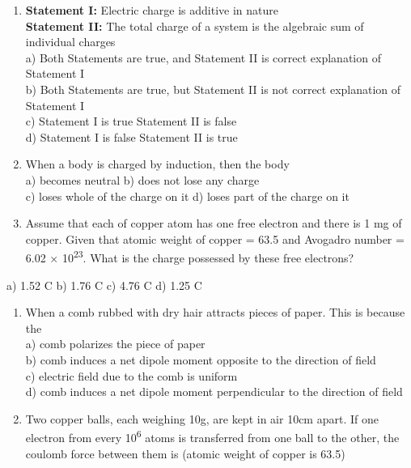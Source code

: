 \begin{enumerate}
\def\labelenumi{\arabic{enumi}.}
\setcounter{enumi}{4}
\item
  \textbf{Statement I:} Electric charge is additive in nature\\
  \textbf{Statement II:} The total charge of a system is the algebraic
  sum of individual charges\\
  a) Both Statements are true, and Statement II is correct explanation
  of Statement I\\
  b) Both Statements are true, but Statement II is not correct
  explanation of Statement I\\
  c) Statement I is true Statement II is false\\
  d) Statement I is false Statement II is true
\item
  When a body is charged by induction, then the body\\
  a) becomes neutral b) does not lose any charge\\
  c) loses whole of the charge on it d) loses part of the charge on it
\item
  Assume that each of copper atom has one free electron and there is 1
  mg of copper. Given that atomic weight of copper = 63.5 and Avogadro
  number = 6.02 × 10\textsuperscript{23}. What is the charge possessed
  by these free electrons?
\end{enumerate}

a) 1.52 C b) 1.76 C c) 4.76 C d) 1.25 C

\begin{enumerate}
\def\labelenumi{\arabic{enumi}.}
\setcounter{enumi}{7}
\item
  When a comb rubbed with dry hair attracts pieces of paper. This is
  because the\\
  a) comb polarizes the piece of paper\\
  b) comb induces a net dipole moment opposite to the direction of
  field\\
  c) electric field due to the comb is uniform\\
  d) comb induces a net dipole moment perpendicular to the direction of
  field
\item
  Two copper balls, each weighing 10g, are kept in air 10cm apart. If
  one electron from every 10\textsuperscript{6} atoms is transferred
  from one ball to the other, the coulomb force between them is (atomic
  weight of copper is 63.5)
\end{enumerate}

